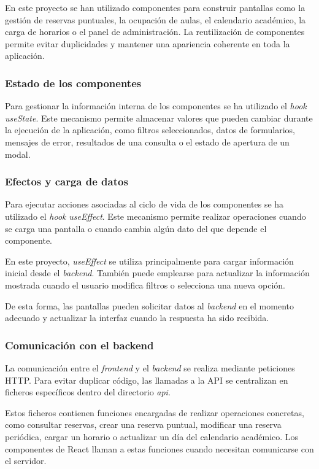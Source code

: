 En este proyecto se han utilizado componentes para construir pantallas como la gestión de reservas puntuales, la ocupación de aulas, el calendario académico, la carga de horarios o el panel de administración. La reutilización de componentes permite evitar duplicidades y mantener una apariencia coherente en toda la aplicación.

\subsubsection{Estado de los componentes}

Para gestionar la información interna de los componentes se ha utilizado el \textit{hook} \textit{useState}. Este mecanismo permite almacenar valores que pueden cambiar durante la ejecución de la aplicación, como filtros seleccionados, datos de formularios, mensajes de error, resultados de una consulta o el estado de apertura de un modal.

\subsubsection{Efectos y carga de datos}

Para ejecutar acciones asociadas al ciclo de vida de los componentes se ha utilizado el \textit{hook} \textit{useEffect}. Este mecanismo permite realizar operaciones cuando se carga una pantalla o cuando cambia algún dato del que depende el componente.

En este proyecto, \textit{useEffect} se utiliza principalmente para cargar información inicial desde el \textit{backend}. También puede emplearse para actualizar la información mostrada cuando el usuario modifica filtros o selecciona una nueva opción.

De esta forma, las pantallas pueden solicitar datos al \textit{backend} en el momento adecuado y actualizar la interfaz cuando la respuesta ha sido recibida.

\subsubsection{Comunicación con el backend}

La comunicación entre el \textit{frontend} y el \textit{backend} se realiza mediante peticiones HTTP. Para evitar duplicar código, las llamadas a la API se centralizan en ficheros específicos dentro del directorio \textit{api}.

Estos ficheros contienen funciones encargadas de realizar operaciones concretas, como consultar reservas, crear una reserva puntual, modificar una reserva periódica, cargar un horario o actualizar un día del calendario académico. Los componentes de React llaman a estas funciones cuando necesitan comunicarse con el servidor.

